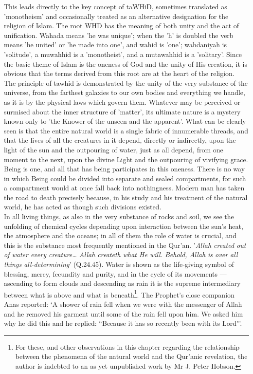 \documentclass[10pt, twoside]{book}
\begin{document}
This leads directly to the key concept of taWHiD, sometimes translated as 'monotheism' and 
occasionally treated as an alternative designation for the religion of Islam. The root WHD has the 
meaning of both unity and the act of unification. Wahada means 'he was unique'; when the 'h' is 
doubled the verb means 'he united' or 'he made into one', and wahid is 'one'; wahdaniyah is 
'solitude', a muwahhid is a 'monotheist', and a mutawahhid is a 'solitary'. Since the basic theme of 
Islam is the oneness of God and the unity of His creation, it is obvious that the terms derived from 
this root are at the heart of the religion. \\

The principle of tawhid is demonstrated by the unity of the very substance of the universe, from the 
farthest galaxies to our own bodies and everything we handle, as it is by the physical laws which 
govern them. Whatever may be perceived or surmised about the inner structure of 'matter', its 
ultimate nature is a mystery known only to 'the Knower of the unseen and the apparent'. What can be 
clearly seen is that the entire natural world is a single fabric of innumerable threads, and that the 
lives of all the creatures in it depend, directly or indirectly, upon the light of the sun and the 
outpouring of water, just as all depend, from one moment to the next, upon the divine Light and the 
outpouring of vivifying grace. Being is one, and all that has being participates in this oneness. 
There is no way in which Being could be divided into separate and sealed compartments, for such a 
compartment would at once fall back into nothingness. Modern man has taken the road to death 
precisely because, in his study and his treatment of the natural world, he has acted as though such 
divisions existed. \\

In all living things, as also in the very substance of rocks and soil, we see the unfolding of 
chemical cycles depending upon interaction between the sun's heat, the atmosphere and the oceans; in 
all of them the role of water is crucial, and this is the substance most frequently mentioned in the 
Qur'an. '\emph{Allah created out of water every creature\ldots{} Allah createth what He will. Behold, Allah is over all things all\hyp{}determining}' (Q.24.45). Water is shown as the life\hyp{}giving symbol of blessing, 
mercy, fecundity and purity, and in the cycle of its movements --- ascending to form clouds and 
descending as rain it is the supreme intermediary between what is above and what is beneath\footnote{For these, and other observations in this chapter regarding the relationship between the phenomena of the natural world and the Qur'anic revelation, the author is indebted to an as yet unpublished work by Mr J. Peter Hobson.}. The Prophet's close companion Anas reported: `A shower of rain fell when we were with the messenger of Allah and he removed his garment until some of the rain fell upon him. We asked him why he did this and he replied: ``Because it has so recently been with its Lord"'. \\
\end{document}
